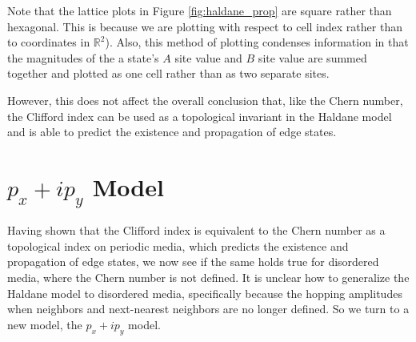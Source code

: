 \documentclass[a4paper]{article}
\begin{document}
Note that the lattice plots in Figure \ref{fig:haldane_prop} are square rather than hexagonal.
This is because we are plotting with respect to cell index rather than to coordinates in $\mathbb{R}^2$).
Also, this method of plotting condenses information in that the magnitudes of the a state's $A$ site value and $B$ site value are summed together and plotted as one cell rather than as two separate sites.

However, this does not affect the overall conclusion that, like the Chern number, the Clifford index can be used as a topological invariant in the Haldane model and is able to predict the existence and propagation of edge states.

\section{\texorpdfstring{$p_x + ip_y$}{px + ipy} Model} 
Having shown that the Clifford index is equivalent to the Chern number as a topological index on periodic media, which predicts the existence and propagation of edge states, we now see if the same holds true for disordered media, where the Chern number is not defined.
It is unclear how to generalize the Haldane model to disordered media, specifically because the hopping amplitudes when neighbors and next-nearest neighbors are no longer defined.
So we turn to a new model, the $p_x + ip_y$ model.
\end{document}

